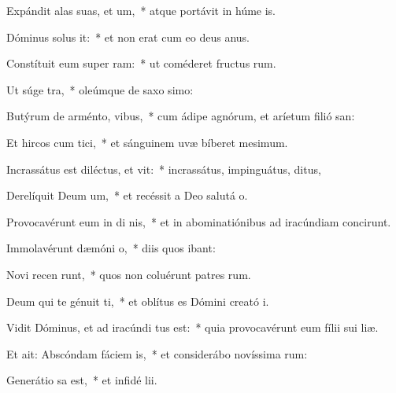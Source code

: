 \item Expándit alas suas, et  um,~* atque portávit in húme is.
\item Dóminus solus   it:~* et non erat cum eo deus anus.
\item Constítuit eum super  ram:~* ut coméderet fructus rum.
\item Ut súge   tra,~* oleúmque de saxo simo:
\item Butýrum de arménto,    vibus,~* cum ádipe agnórum, et aríetum filió san:
\item Et hircos cum  tici,~* et sánguinem uvæ bíberet mesimum.
\item Incrassátus est diléctus, et vit:~* incrassátus, impinguátus, ditus,
\item Derelíquit Deum  um,~* et recéssit a Deo salutá o.
\item Provocavérunt eum in di nis,~* et in abominatiónibus ad iracúndiam concirunt.
\item Immolavérunt dæmóni   o,~* diis quos ibant:
\item Novi recen runt,~* quos non coluérunt patres rum.
\item Deum qui te génuit ti,~* et oblítus es Dómini creató i.
\item \singlecolsep
\item Vidit Dóminus, et ad iracúndi tus est:~* quia provocavérunt eum fílii sui  liæ.
\item Et ait: Abscóndam fáciem   is,~* et considerábo novíssima rum:
\item Generátio  sa est,~* et infidé lii.
